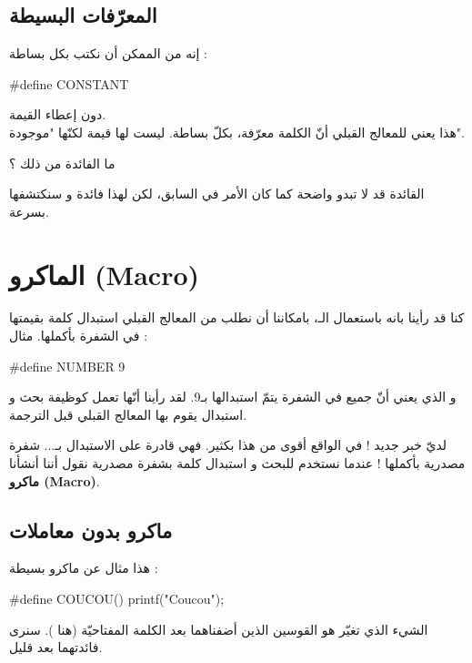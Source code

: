 \subsection{المعرّفات البسيطة}
إنه من الممكن أن نكتب بكل بساطة :
\begin{Csource}
#define CONSTANT
\end{Csource}
دون إعطاء القيمة.\\
هذا يعني للمعالج القبلي أنّ الكلمة
معرّفة، بكلّ بساطة. ليست لها قيمة لكنّها "موجودة".
\begin{question}
  ما الفائدة من ذلك ؟
\end{question}
القائدة قد لا تبدو واضحة كما كان الأمر في السابق، لكن لهذا فائدة و سنكتشفها بسرعة.

\section{الماكرو (\textenglish{Macro})}
كنا قد رأينا بانه باستعمال الـ،
بامكاننا أن نطلب من المعالج القبلي استبدال كلمة بقيمتها في الشفرة بأكملها. مثال :
\begin{Csource}
#define NUMBER 9
\end{Csource}
و الذي يعني أنّ جميع
في الشفرة يتمّ استبدالها بـ9. لقد رأينا أنّها تعمل كوظيفة بحث و استبدال يقوم بها المعالج القبلي قبل الترجمة.

لديّ خبر جديد ! في الواقع
أقوى من هذا بكثير. فهي قادرة على الاستبدال بـ... شفرة مصدرية بأكملها ! عندما نستخدم
للبحث و استبدال كلمة بشفرة مصدرية نقول أننا أنشأنا
\textbf{ماكرو
(\textenglish{Macro})}.

\subsection{ماكرو بدون معاملات}
هذا مثال عن ماكرو بسيطة :
\begin{Csource}
#define COUCOU() printf("Coucou");
\end{Csource}
الشيء الذي تغيّر هو القوسين الذين أضفناهما بعد الكلمة المفتاحيّة (هنا
).
سنرى فائدتهما بعد قليل.

